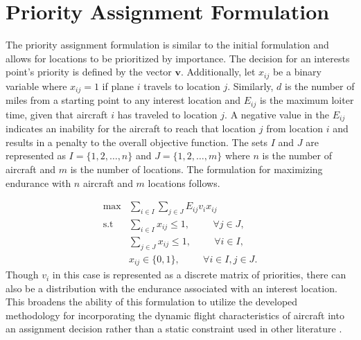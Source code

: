 \section{Priority Assignment Formulation}
The priority assignment formulation is similar to the initial formulation and allows for locations to be prioritized by importance. The decision for an interests point's priority is defined by the vector $\mathbf{v}$. Additionally, let $x_{ij}$ be a binary variable where $x_{ij} = 1$ if plane $i$ travels to location $j$. Similarly, $d$ is the number of miles from a starting point to any interest location and $E_{ij}$ is the maximum loiter time, given that aircraft $i$ has traveled to location $j$. A negative value in the $E_{ij}$ indicates an inability for the aircraft to reach that location $j$ from location $i$ and results in a penalty to the overall objective function. The sets $I$ and $J$ are represented as $I = \{1,2,\dots,n\}$ and $J = \{1,2,\dots,m\}$ where $n$ is the number of aircraft and $m$ is the number of locations. The formulation for maximizing endurance with $n$ aircraft and $m$ locations follows.\par
\begin{equation}
    \begin{aligned}
        \max &\sum_{i\in I}\sum_{j\in J} E_{ij}v_{i}x_{ij}\hspace{1cm}\\
        \text{s.t } &\sum_{i\in I}x_{ij} \leq 1,\hspace{1cm} \forall j\in J,\\
        &\sum_{j\in J}x_{ij} \leq 1,\hspace{1cm} \forall i \in I,\\
        &x_{ij}\in \{0,1\}, \hspace{1cm} \forall i\in I, j\in J.
    \end{aligned}
\end{equation}
Though $v_i$ in this case is represented as a discrete matrix of priorities, there can also be a distribution with the endurance associated with an interest location. This broadens the ability of this formulation to utilize the developed methodology for incorporating the dynamic flight characteristics of aircraft into an assignment decision rather than a static constraint used in other literature \cite{Alighanbari,Schumacher,Taylor}.
